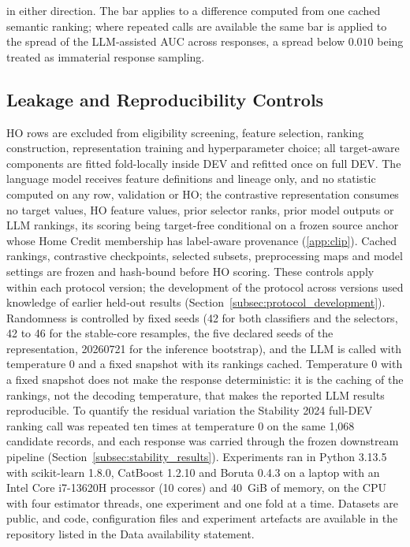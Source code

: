 \documentclass[final,5p,twocolumn]{elsarticle}
\begin{document}
in either direction. The bar applies to a difference computed from one cached semantic ranking; where repeated calls are available the same bar is applied to the spread of the LLM-assisted AUC across responses, a spread below $0.010$ being treated as immaterial response sampling.

\subsection{Leakage and Reproducibility Controls}
\label{subsec:leakage_controls}

HO rows are excluded from eligibility screening, feature selection, ranking construction, representation training and hyperparameter choice; all target-aware components are fitted fold-locally inside DEV and refitted once on full DEV. The language model receives feature definitions and lineage only, and no statistic computed on any row, validation or HO; the contrastive representation consumes no target values, HO feature values, prior selector ranks, prior model outputs or LLM rankings, its scoring being target-free conditional on a frozen source anchor whose Home Credit membership has label-aware provenance (\ref{app:clip}). Cached rankings, contrastive checkpoints, selected subsets, preprocessing maps and model settings are frozen and hash-bound before HO scoring. These controls apply within each protocol version; the development of the protocol across versions used knowledge of earlier held-out results (Section~\ref{subsec:protocol_development}). Randomness is controlled by fixed seeds (42 for both classifiers and the selectors, 42 to 46 for the stable-core resamples, the five declared seeds of the representation, 20260721 for the inference bootstrap), and the LLM is called with temperature 0 and a fixed snapshot with its rankings cached. Temperature 0 with a fixed snapshot does not make the response deterministic: it is the caching of the rankings, not the decoding temperature, that makes the reported LLM results reproducible. To quantify the residual variation the Stability 2024 full-DEV ranking call was repeated ten times at temperature 0 on the same 1,068 candidate records, and each response was carried through the frozen downstream pipeline (Section~\ref{subsec:stability_results}). Experiments ran in Python 3.13.5 with scikit-learn 1.8.0, CatBoost 1.2.10 and Boruta 0.4.3 on a laptop with an Intel Core i7-13620H processor (10 cores) and 40~GiB of memory, on the CPU with four estimator threads, one experiment and one fold at a time. Datasets are public, and code, configuration files and experiment artefacts are available in the repository listed in the Data availability statement.
\end{document}
